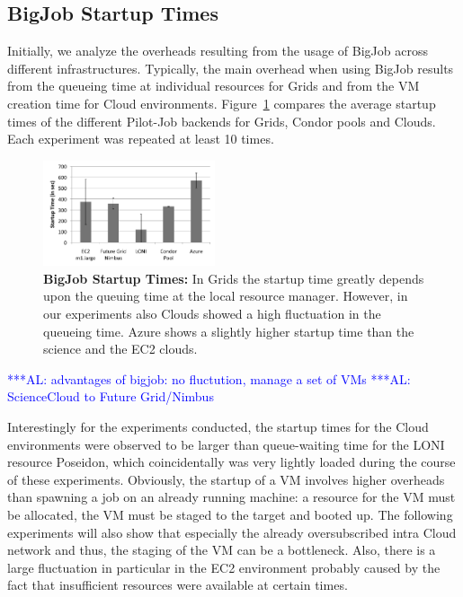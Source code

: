 \documentclass[conference,final]{IEEEtran}
\newcommand{\up}{\vspace*{-1em}}
\newcommand{\alnote}[1]{ {\textcolor{blue} { ***AL: #1 }}}
\newcommand{\alnote}[1]{}
\begin{document}
\subsection{BigJob Startup Times} 


Initially, we analyze the overheads resulting from the usage of BigJob across
different infrastructures. Typically, the main overhead when using
BigJob results from the queueing time at individual resources for
Grids and from the VM creation time for Cloud environments.
Figure~\ref{fig:performance_setup_time} compares the average startup times of
the different Pilot-Job backends for Grids, Condor pools and Clouds. Each 
experiment was repeated at least 10 times.

\begin{figure}[htbp]
    \centering
        \includegraphics[width=0.45\textwidth]{performance/setup-times}
    \caption{\textbf{BigJob Startup Times:} In Grids the startup time
      greatly depends upon the queuing time at the local resource
      manager. However, in our experiments also Clouds showed a high
      fluctuation in the queueing time. Azure shows a slightly higher
      startup time than the science and the EC2 clouds.\up}
    \label{fig:performance_setup_time}
\end{figure}
\alnote{advantages of bigjob: no fluctution, manage a set of VMs}
\alnote{ScienceCloud to Future Grid/Nimbus}

Interestingly for the experiments conducted, the startup times for the
Cloud environments were observed to be larger than queue-waiting time
for the LONI resource Poseidon, which coincidentally was very lightly
loaded during the course of these experiments. Obviously, the startup
of a VM involves higher overheads than spawning a job on an already
running machine: a resource for the VM must be allocated, the VM must
be staged to the target and booted up. The following experiments will
also show that especially the already oversubscribed intra Cloud
network and thus, the staging of the VM can be a bottleneck. Also,
there is a large fluctuation in particular in the EC2 environment
probably caused by the fact that insufficient resources were available
at certain times.
\end{document}
